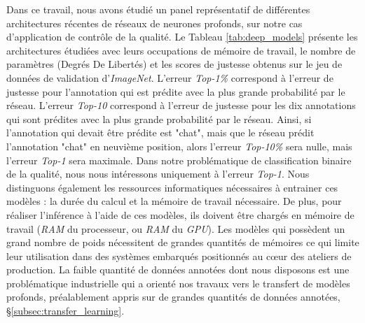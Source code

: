 Dans ce travail, nous avons étudié un panel représentatif de différentes architectures récentes de réseaux de neurones profonds, sur notre cas d'application de contrôle de la qualité.
Le Tableau \ref{tab:deep_models} présente les architectures étudiées avec leurs occupations de mémoire de travail, le nombre de paramètres (Degrés De Libertés) et les scores de justesse obtenus sur le jeu de données de validation d'\textit{ImageNet}.
L'erreur \textit{Top-1\%} correspond à l'erreur de justesse pour l'annotation qui est prédite avec la plus grande probabilité par le réseau.
L'erreur \textit{Top-10} correspond à l'erreur de justesse pour les dix annotations qui sont prédites avec la plus grande probabilité par le réseau.
Ainsi, si l'annotation qui devait être prédite est "chat", mais que le réseau prédit l'annotation "chat" en neuvième position, alors l'erreur \textit{Top-10\%} sera nulle, mais l'erreur \textit{Top-1} sera maximale.
Dans notre problématique de classification binaire de la qualité, nous nous intéressons uniquement à l'erreur \textit{Top-1}.
Nous distinguons également les ressources informatiques nécessaires à entrainer ces modèles : la durée du calcul et la mémoire de travail nécessaire.
De plus, pour réaliser l'inférence à l'aide de ces modèles, ils doivent être chargés en mémoire de travail (\textit{RAM} du processeur, ou \textit{RAM} du \textit{GPU}).
Les modèles qui possèdent un grand nombre de poids nécessitent de grandes quantités de mémoires ce qui limite leur utilisation dans des systèmes embarqués positionnés au cœur des ateliers de production.
La faible quantité de données annotées dont nous disposons est une problématique industrielle qui a orienté nos travaux vers le transfert de modèles profonds, préalablement appris sur de grandes quantités de données annotées, §\ref{subsec:transfer_learning}.

